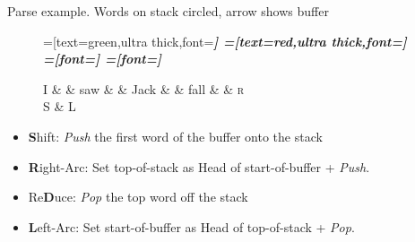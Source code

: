 \documentclass{lecture}
\begin{document}
\begin{plain}{Parse example. Words on stack circled, arrow shows buffer}

\begin{figure}
    \centering
    \begin{dependency}[theme=simple]
    =[text=green,ultra thick,font=\bfseries\itshape]
    =[text=red,ultra thick,font=\bfseries\itshape]
    =[font=\bfseries\itshape]
    =[font=\itshape]
    \begin{deptext}[column sep=.075cm, row sep=.1ex]
        I \&           \& saw \&          \& Jack       \& \& fall   \& \& \textsc{r} \\
      S   \& L \\ 
    \end{deptext}
\end{dependency}
\end{figure}
    \begin{itemize}
        \item \textbf{S}hift: \emph{Push} the first word of the buffer onto the stack
    \item \textbf{R}ight-Arc: Set top-of-stack as Head of start-of-buffer + \emph{Push}.
    \item Re\textbf{D}uce: \emph{Pop} the top word off the stack
    \item \textbf{L}eft-Arc: Set start-of-buffer as Head of top-of-stack + \emph{Pop}.
    \end{itemize}

\end{plain}
\end{document}
